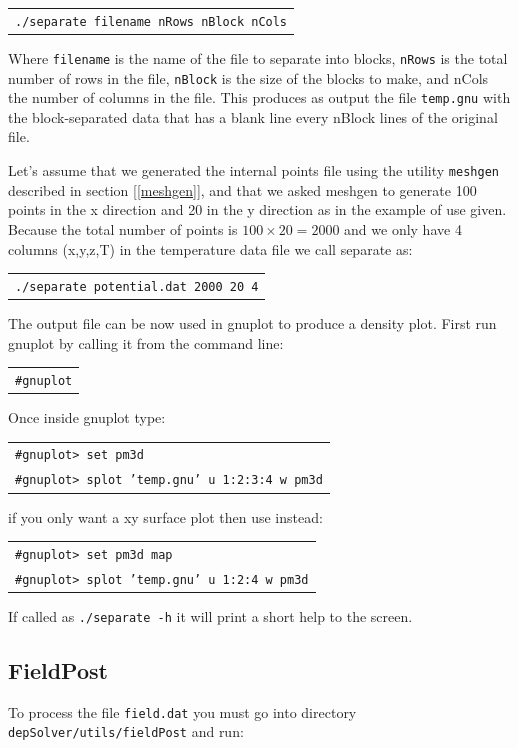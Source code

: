 \documentclass[12pt]{article}
\begin{document}
\begin{tabular}{l}
\texttt{./separate filename nRows nBlock nCols}
\end{tabular}

Where \verb+filename+ is the name of the file to separate into blocks, \verb+nRows+ is the total number of rows in the file, \verb+nBlock+ is the size of the blocks to make, and nCols the number of columns in the file. This produces as output the file \verb+temp.gnu+ with the block-separated data that has a blank line every nBlock lines of the original file.

Let's assume that we generated the internal points file using the utility \verb+meshgen+ described in section [\ref{meshgen}], and that we asked meshgen to generate 100 points in the x direction and 20 in the y direction as in the example of use given. Because the total number of points is $100\times20=2000$ and we only have 4 columns (x,y,z,T) in the temperature data file we call separate as:

\begin{tabular}{l}
\texttt{./separate potential.dat 2000 20 4}
\end{tabular}

The output file can be now used in gnuplot to produce a density plot. First run gnuplot by calling it from the command line:

\begin{tabular}{l}
\verb+#gnuplot+
\end{tabular}

Once inside gnuplot type:

\begin{tabular}{l}
\texttt{\#gnuplot> set pm3d}\\
\texttt{\#gnuplot> splot 'temp.gnu' u 1:2:3:4 w pm3d}
\end{tabular}

if you only want a xy surface plot then use instead:

\begin{tabular}{l}
\texttt{\#gnuplot> set pm3d map}\\
\texttt{\#gnuplot> splot 'temp.gnu' u 1:2:4 w pm3d}
\end{tabular}

If called as \verb+./separate -h+ it will print a short help to the screen.

\subsection{FieldPost}
To process the file \verb+field.dat+ you must go into directory \verb+depSolver/utils/fieldPost+ and run:
\end{document}
